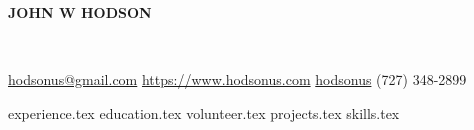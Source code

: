 \documentclass[11pt]{article}
\newcommand*{\sectiondir}{sections/}
\newcommand*{\headerspace}{\vspace{.05cm}}
\begin{document}
	\noindent\centerline{ \huge\textbf{JOHN W HODSON}}\\
	\headerspace

	\noindent
	\faEnvelopeSquare \space\href{mailto:hodsonus@gmail.com}{hodsonus@gmail.com} \hspace*{\fill}
	\faHome \space \href{https://www.hodsonus.com}{https://www.hodsonus.com} \hspace*{\fill}
	\faGithub \space \href{https://github.com/hodsonus}{hodsonus} \hspace*{\fill}
	\faMobilePhone \space (727) 348-2899\\
	\headerspace

	{experience.tex}
	{education.tex}
	{volunteer.tex}
	{projects.tex}
	{skills.tex}
\end{document}
